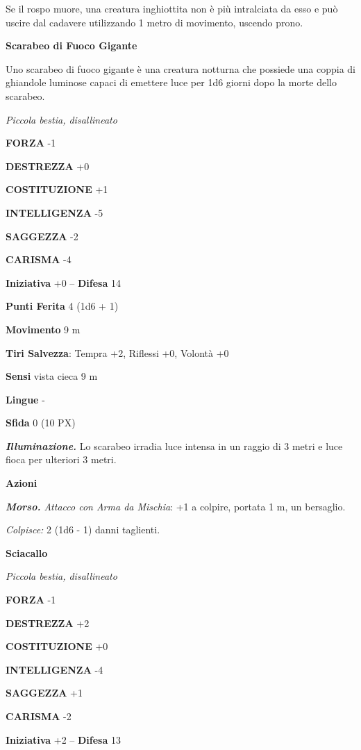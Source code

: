 \begin{multicols}{2}
	Se il rospo muore, una creatura inghiottita non è più intralciata da esso e può uscire dal cadavere utilizzando 1 metro di movimento, uscendo prono.

	\medskip\textbf{Scarabeo di Fuoco Gigante}

	Uno scarabeo di fuoco gigante è una creatura notturna che possiede una coppia di ghiandole luminose capaci di emettere luce per 1d6 giorni dopo la morte dello scarabeo.

	\textit{Piccola bestia, disallineato}

	\textbf{FORZA} -1

	\textbf{DESTREZZA} +0

	\textbf{COSTITUZIONE} +1

	\textbf{INTELLIGENZA} -5

	\textbf{SAGGEZZA} -2

	\textbf{CARISMA} -4

	\textbf{Iniziativa} +0 -- \textbf{Difesa} 14

	\textbf{Punti Ferita} 4 (1d6 + 1)

	\textbf{Movimento} 9 m

	\textbf{Tiri Salvezza}: Tempra +2, Riflessi +0, Volontà +0

	\textbf{Sensi} vista cieca 9 m

	\textbf{Lingue} -

	\textbf{Sfida} 0 (10 PX)

	\textit{\textbf{Illuminazione.}} Lo scarabeo irradia luce intensa in un raggio di 3 metri e luce fioca per ulteriori 3 metri.

	\textbf{Azioni}

	\textit{\textbf{Morso.} Attacco con Arma da Mischia}: +1 a colpire, portata 1 m, un bersaglio.

	\textit{Colpisce:} 2 (1d6 - 1) danni taglienti.

	\medskip\textbf{Sciacallo}

	\textit{Piccola bestia, disallineato}

	\textbf{FORZA} -1

	\textbf{DESTREZZA} +2

	\textbf{COSTITUZIONE} +0

	\textbf{INTELLIGENZA} -4

	\textbf{SAGGEZZA} +1

	\textbf{CARISMA} -2

	\textbf{Iniziativa} +2 -- \textbf{Difesa} 13


\end{multicols}
